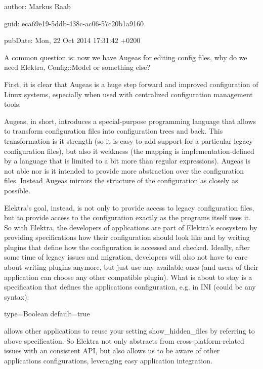 
\begin{DoxyItemize}
\item author\+: Markus Raab
\item guid\+: eca69e19-\/5ddb-\/438c-\/ac06-\/57c20b1a9160
\item pub\+Date\+: Mon, 22 Oct 2014 17\+:31\+:42 +0200
\end{DoxyItemize}

A common question is\+: now we have Augeas for editing config files, why do we need Elektra, Config\+::\+Model or something else?

First, it is clear that Augeas is a huge step forward and improved configuration of Linux systems, especially when used with centralized configuration management tools.

Augeas, in short, introduces a special-\/purpose programming language that allows to transform configuration files into configuration trees and back. This transformation is it strength (so it is easy to add support for a particular legacy configuration files), but also it weakness (the mapping is implementation-\/defined by a language that is limited to a bit more than regular expressions). Augeas is not able nor is it intended to provide more abstraction over the configuration files. Instead Augeas mirrors the structure of the configuration as closely as possible.

Elektra’s goal, instead, is not only to provide access to legacy configuration files, but to provide access to the configuration exactly as the programs itself uses it. So with Elektra, the developers of applications are part of Elektra’s ecosystem by providing specifications how their configuration should look like and by writing plugins that define how the configuration is accessed and checked. Ideally, after some time of legacy issues and migration, developers will also not have to care about writing plugins anymore, but just use any available ones (and users of their application can choose any other compatible plugin). What is about to stay is a specification that defines the application\textquotesingle{}s configuration, e.\+g. in I\+NI (could be any syntax)\+:


\begin{DoxyCode}
type=Boolean
default=true
\end{DoxyCode}


allows other applications to reuse your setting show\+\_\+hidden\+\_\+files by referring to above specification. So Elektra not only abstracts from cross-\/platform-\/related issues with an consistent A\+PI, but also allows us to be aware of other applications\textquotesingle{} configurations, leveraging easy application integration.

